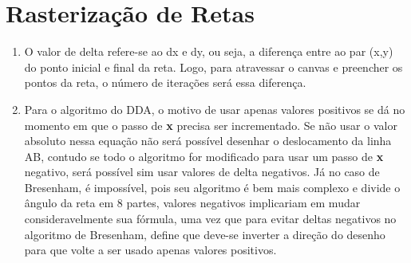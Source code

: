 \section*{Rasterização de Retas}

	\begin{enumerate}\addtocounter{enumi}{5}
		\item 
		
		O valor de delta refere-se ao dx e dy, ou seja, a diferença entre ao par (x,y) do
		ponto inicial e final da reta. Logo, para atravessar o canvas e preencher os pontos
		da reta, o número de iterações será essa diferença.
		
		\item 
		
       Para o algoritmo do DDA, o motivo de usar apenas valores positivos se dá no
      momento em que o passo de \textbf{x} precisa ser incrementado. Se não usar o valor absoluto nessa equação não será possível desenhar o deslocamento da linha AB, contudo se todo o algoritmo for modificado para usar um passo de \textbf{x} negativo, será possível sim usar valores de delta negativos. Já no caso de Bresenham, é impossível, pois seu algoritmo é bem mais complexo e divide o ângulo da reta em 8 partes, valores negativos implicariam em mudar consideravelmente sua fórmula, uma vez que para evitar deltas negativos no algoritmo de Bresenham, define que deve-se inverter a direção do desenho para que volte a ser usado apenas valores positivos.
	\end{enumerate}